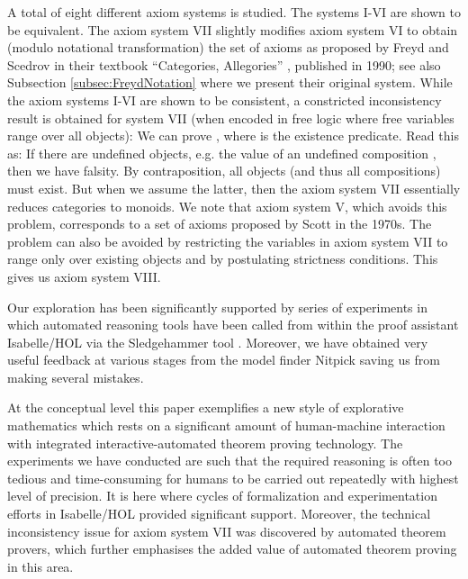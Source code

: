 \begin{isabellebody}
\begin{isamarkuptext}
A total of eight different axiom systems is studied. The systems I-VI are shown to 
be equivalent. The axiom system VII slightly modifies axiom system VI to obtain (modulo 
notational transformation) the set of axioms as proposed by  Freyd and Scedrov in their textbook
 ``Categories, Allegories'' \cite{FreydScedrov90}, published in 1990; 
see also Subsection \ref{subsec:FreydNotation} where we present their original system.
While the axiom systems I-VI are shown to be  consistent, a constricted inconsistency result is 
obtained for system VII (when encoded in free logic where free variables range over all 
objects): We can prove , where  is the existence predicate. Read this as: If there 
are undefined objects, e.g. the value of an undefined composition , then we have falsity.
By contraposition, all objects (and thus all compositions) must exist. But when we assume the latter,
then the axiom system VII essentially reduces categories to monoids.
We note that axiom system V, which avoids this problem, corresponds to a set of axioms proposed 
by Scott \cite{Scott79} in the 1970s. The problem can also be avoided by restricting the variables 
in axiom system VII to range only over existing objects and by postulating strictness conditions. 
This gives us axiom system VIII.

Our exploration has been significantly supported by series of experiments in which automated reasoning tools 
have been called from within the proof assistant Isabelle/HOL \cite{Isabelle} via the Sledgehammer 
tool \cite{Sledgehammer}. Moreover, we have obtained very useful feedback at various stages 
from the model finder Nitpick \cite{Nitpick} saving us from making several mistakes.

At the conceptual level this paper exemplifies a new style of explorative mathematics which rests 
on a significant amount of human-machine interaction with integrated interactive-auto\-ma\-ted 
theorem proving technology. The experiments we have conducted are such that the required 
reasoning is often too tedious and time-consuming for humans to be carried out repeatedly with 
highest level of precision. It is here where cycles of formalization and experimentation efforts in 
Isabelle/HOL provided  significant support. Moreover, the technical inconsistency issue for
axiom system VII was discovered by automated theorem provers, which further emphasises the added 
value of automated theorem proving in this area. 


\end{isamarkuptext}
\end{isabellebody}
